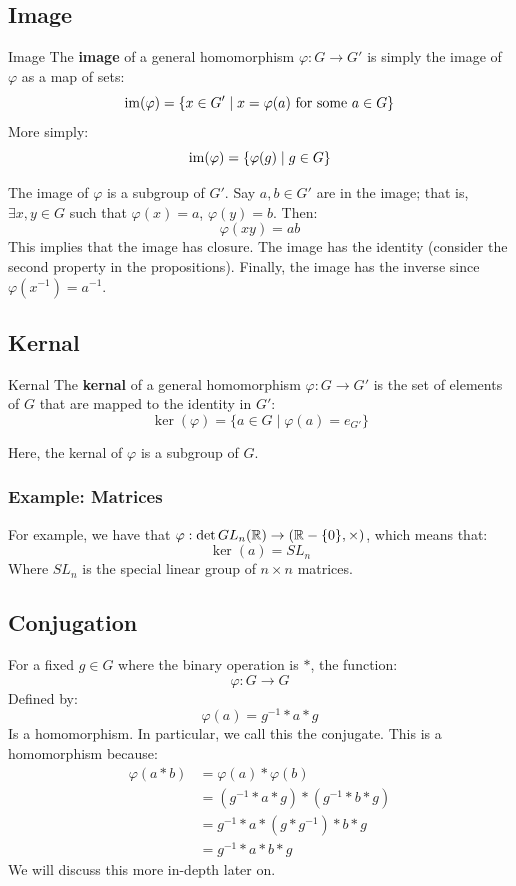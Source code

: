 \documentclass[letterpaper]{article}
\begin{document}
\subsection{Image}
\begin{definition}{Image}{}
    The \textbf{image} of a general homomorphism $\varphi: G \to G'$ is simply the image of $\varphi$ as a map of sets: 
    \[\operatorname{im}(\varphi) = \{x \in G' \mid x = \varphi(a) \text{ for some } a \in G\}\]
    More simply: 
    \[\operatorname{im}(\varphi) = \{\varphi(g) \mid g \in G\}\]
\end{definition}
The image of $\varphi$ is a subgroup of $G'$. Say $a, b \in G'$ are in the image; that is, $\exists x, y \in G$ such that $\varphi(x) = a$, $\varphi(y) = b$. Then: 
\[\varphi(xy) = ab\]
This implies that the image has closure. The image has the identity (consider the second property in the propositions). Finally, the image has the inverse since $\varphi(x^{-1}) = a^{-1}$. 

\subsection{Kernal}
\begin{definition}{Kernal}{}
    The \textbf{kernal} of a general homomorphism $\varphi: G \to G'$ is the set of elements of $G$ that are mapped to the identity in $G'$: 
    \[\ker(\varphi) = \{a \in G \mid \varphi(a) = e_{G'}\}\]
\end{definition}
Here, the kernal of $\varphi$ is a subgroup of $G$. 


\subsubsection{Example: Matrices}
For example, we have that $\varphi: \det GL_n (\mathbb{R}) \to (\mathbb{R} - \{0\}, \times)$, which means that: 
\[\ker(a) = SL_n\]
Where $SL_n$ is the special linear group of $n \times n$ matrices. 

\subsection{Conjugation}
For a fixed $g \in G$ where the binary operation is $*$, the function: 
\[\varphi: G \to G\]
Defined by: 
\[\varphi(a) = g^{-1} * a * g\]
Is a homomorphism. In particular, we call this the conjugate. This is a homomorphism because: 
\begin{equation*}
    \begin{aligned}
        \varphi(a * b) &= \varphi(a) * \varphi(b) \\ 
            &= (g^{-1} * a * g) * (g^{-1} * b * g) \\ 
            &= g^{-1} * a * (g * g^{-1}) * b * g \\ 
            &= g^{-1} * a * b * g
    \end{aligned}
\end{equation*}
We will discuss this more in-depth later on. 
\end{document}
